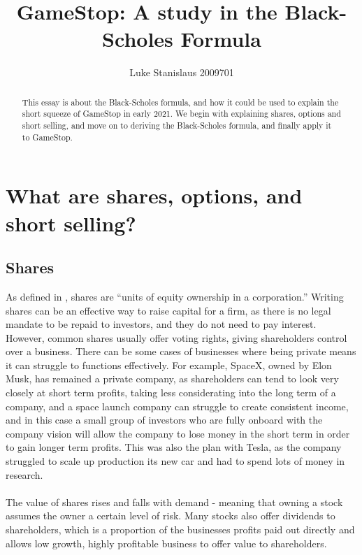 \documentclass[11pt]{article} %
\title{GameStop: A study in the Black-Scholes Formula}
\author{Luke Stanislaus 2009701}
\begin{document}
\maketitle
\tableofcontents
\begin{abstract}
    This essay is about the Black-Scholes formula, and how it could be 
    used to explain the short squeeze of GameStop in early 2021. We begin 
    with explaining shares, options and short selling, and move on to 
    deriving the Black-Scholes formula, and finally apply it to GameStop.
    \end{abstract}



\section{What are shares, options, and short selling?}
\subsection{Shares}
As defined in \cite{shares}, shares are ``units of equity 
ownership in a corporation.'' Writing shares can be an effective way to raise 
capital for a firm, as there is no legal mandate to be repaid to 
investors, and they do not need to pay interest. However, common shares usually offer voting 
rights, giving shareholders control over a business. There can be some cases 
of businesses where being private means it can struggle to functions effectively.
For example, SpaceX, owned by Elon Musk, has remained a private company, as 
shareholders can tend to look very closely at short term profits, taking less 
considerating into the long term of a company, and a space launch company can 
struggle to create consistent income, and in this case a small group of investors 
who are fully onboard with the company vision will allow the company to lose 
money in the short term in order to gain longer term profits. This was also 
the plan with Tesla, as the company struggled to scale up production its new 
car and had to spend lots of money in research. 
\paragraph{}
The value of 
shares rises and falls with demand - meaning that owning a stock assumes 
the owner a certain level of risk. Many stocks also offer dividends to 
shareholders, which is a proportion of the businesses profits paid out 
directly and allows low growth, highly profitable business to offer value 
to shareholders.
\end{document}
